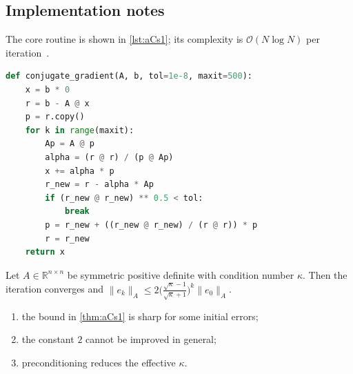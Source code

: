 \subsection{Implementation notes}\label{sec:aCs1-i}
The core routine is shown in \cref{lst:aCs1}; its complexity is $\mathcal{O}(N\log N)$ per iteration~\cite{appx-12}.

\begin{lstlisting}[language=python,caption={Reference implementation for aCs1.},label={lst:aCs1}]
def conjugate_gradient(A, b, tol=1e-8, maxit=500):
    x = b * 0
    r = b - A @ x
    p = r.copy()
    for k in range(maxit):
        Ap = A @ p
        alpha = (r @ r) / (p @ Ap)
        x += alpha * p
        r_new = r - alpha * Ap
        if (r_new @ r_new) ** 0.5 < tol:
            break
        p = r_new + ((r_new @ r_new) / (r @ r)) * p
        r = r_new
    return x
\end{lstlisting}

\lipsum[1-1]
\begin{theorem}\label{thm:aCs1}
Let $A\in\mathbb{R}^{n\times n}$ be symmetric positive definite with condition number $\kappa$. Then the iteration converges and
$\lVert e_k\rVert_A \le 2\bigl(\tfrac{\sqrt\kappa-1}{\sqrt\kappa+1}\bigr)^k\lVert e_0\rVert_A$.
\end{theorem}
\begin{enumerate}[label=(\roman*)]
\item the bound in \cref{thm:aCs1} is sharp for some initial errors;
\item the constant $2$ cannot be improved in general;
\item preconditioning reduces the effective $\kappa$.
\end{enumerate}

\lipsum[114-114]
